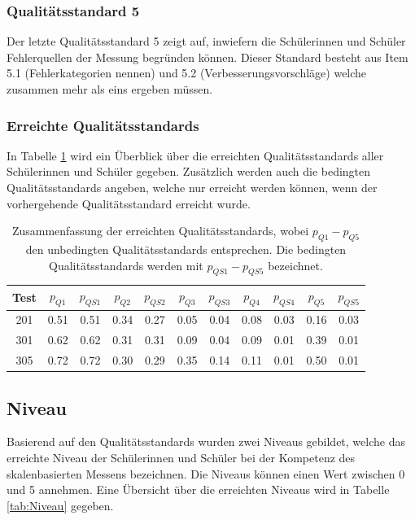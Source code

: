 \subsubsection*{Qualitätsstandard 5}
Der letzte Qualitätsstandard 5 zeigt auf, inwiefern die Schülerinnen und Schüler Fehlerquellen der Messung begründen können. Dieser Standard besteht aus Item 5.1 (Fehlerkategorien nennen) und 5.2 (Verbesserungsvorschläge) welche zusammen mehr als eins ergeben müssen.

\subsubsection{Erreichte Qualitätsstandards}

In Tabelle \ref{tab:QS} wird ein Überblick über die erreichten Qualitätsstandards aller Schülerinnen und Schüler gegeben. Zusätzlich werden auch die bedingten Qualitätsstandards angeben, welche nur erreicht werden können, wenn der vorhergehende Qualitätsstandard erreicht wurde.


\begin{table}[!htbp]
  \centering
\begin{tabular}{ccccccccccc}
\toprule
 Test & $p_{Q1}$ & $p_{QS1}$ & $p_{Q2}$ & $p_{QS2}$& $p_{Q3}$& $p_{QS3}$& $p_{Q4}$& $p_{QS4}$& $p_{Q5}$& $p_{QS5}$\\ 
\midrule
 201 &   0.51 & 0.51& 0.34 & 0.27 & 0.05 & 0.04 & 0.08 & 0.03 & 0.16 & 0.03 \\ 
 301 &   0.62 & 0.62& 0.31 & 0.31 & 0.09 & 0.04 & 0.09 & 0.01 & 0.39 & 0.01\\ 
 305 &   0.72 & 0.72& 0.30 & 0.29 & 0.35 & 0.14 & 0.11 & 0.01 & 0.50 & 0.01\\ 
\bottomrule
\end{tabular} 
  \caption{Zusammenfassung der erreichten Qualitätsstandards, wobei $p_{Q1} - p_{Q5}$ den unbedingten Qualitätsstandards entsprechen. Die bedingten Qualitätsstandards werden mit $p_{QS1} - p_{QS5}$ bezeichnet.}
  \label{tab:QS}
\end{table}




\subsection{Niveau}

Basierend auf den Qualitätsstandards wurden zwei Niveaus gebildet, welche das erreichte Niveau der Schülerinnen und Schüler bei der Kompetenz des skalenbasierten Messens bezeichnen. Die Niveaus können einen Wert zwischen 0 und 5 annehmen. Eine Übersicht über die erreichten Niveaus wird in Tabelle \ref{tab:Niveau} gegeben.

